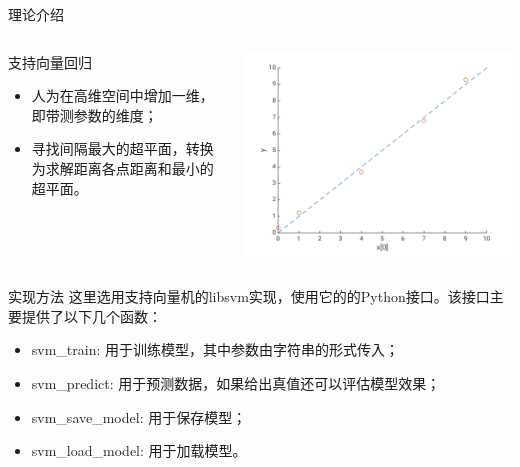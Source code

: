\documentclass[11pt]{beamer}
\begin{document}
	\begin{frame}{理论介绍}
		\begin{columns}
			\begin{block}{支持向量回归}
				\begin{itemize}
					\item 人为在高维空间中增加一维，即带测参数的维度；
					\item 寻找间隔最大的超平面，转换为求解距离各点距离和最小的超平面。
				\end{itemize}
			\end{block}
			\includegraphics[width=\linewidth]{img/SVR}
		\end{columns}
	\end{frame}
	\begin{frame}{实现方法}
		这里选用支持向量机的libsvm实现，使用它的的Python接口。该接口主要提供了以下几个函数：
		\begin{itemize}
			\item svm\_train: 用于训练模型，其中参数由字符串的形式传入；
			\item svm\_predict: 用于预测数据，如果给出真值还可以评估模型效果；
			\item svm\_save\_model: 用于保存模型；
			\item svm\_load\_model: 用于加载模型。
		\end{itemize}
	\end{frame}
\end{document}
